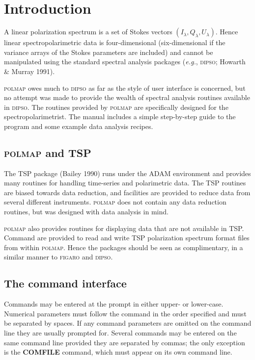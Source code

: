 \documentclass[11pt,nolof,noabs]{starlink}
\begin{document}
\scfrontmatter

\section{Introduction}

A linear polarization spectrum is a set of Stokes vectors
$(I_{\lambda},Q_{\lambda},U_{\lambda})$. Hence linear
spectropolarimetric data is four-dimensional (six-dimensional if the
variance arrays of the Stokes parameters are included) and cannot be
manipulated using the standard spectral analysis packages (\emph{e.g.},
\textsc{dipso}; Howarth \& Murray 1991).

\textsc{polmap} owes much to \textsc{dipso} as far as the style of user
interface is concerned, but no attempt was made to provide the wealth
of spectral analysis routines available in \textsc{dipso}. The routines
provided by \textsc{polmap} are specifically designed for the
spectropolarimetrist. The manual includes a simple step-by-step guide
to the program and some example data analysis recipes.

\subsection{\textsc{polmap} and TSP }

The TSP package (Bailey 1990) runs under the ADAM environment and
provides many routines for handling time-series and polarimetric data.
The TSP routines are biased towards data reduction, and facilities are
provided to reduce data from several different instruments. \textsc{polmap} does not contain any data reduction routines, but was designed
with data analysis in mind.

\textsc{polmap} also provides routines for displaying data that are not
available in TSP. Command are provided to read and write TSP
polarization spectrum format files from within \textsc{polmap}.  Hence the
packages should be seen as complimentary, in a similar manner to \textsc{figaro}
and \textsc{dipso}.

\subsection{The command interface}

Commands may be entered at the prompt in either upper- or lower-case.
Numerical parameters must follow the command in the order specified and
must be separated by spaces. If any command parameters are omitted on
the command line they are usually prompted for. Several commands may be
entered on the same command line provided they are separated by commas;
the only exception is the \textbf{COMFILE} command, which must appear on
its own command line.
\end{document}
